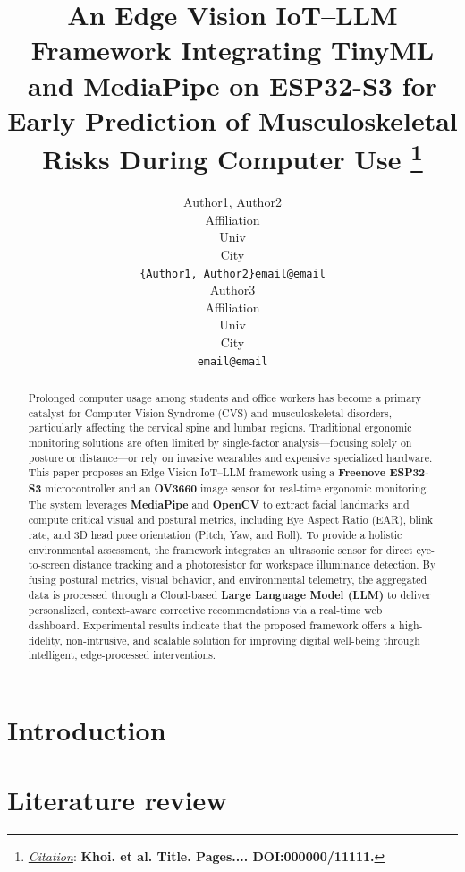 \documentclass{article}
\title{An Edge Vision IoT–LLM Framework Integrating TinyML and MediaPipe on ESP32-S3 for Early Prediction of Musculoskeletal Risks During Computer Use
\thanks{\textit{\underline{Citation}}: 
\textbf{Khoi. et al. Title. Pages.... DOI:000000/11111.}} 
}
\author{
  Author1, Author2 \\
  Affiliation \\
  Univ \\
  City\\
  \texttt{\{Author1, Author2\}email@email} \\
   \And
  Author3 \\
  Affiliation \\
  Univ \\
  City\\
  \texttt{email@email} \\
}
\begin{document}
\maketitle

\begin{abstract}
Prolonged computer usage among students and office workers has become a primary catalyst for Computer Vision Syndrome (CVS) and musculoskeletal disorders, particularly affecting the cervical spine and lumbar regions. Traditional ergonomic monitoring solutions are often limited by single-factor analysis---focusing solely on posture or distance---or rely on invasive wearables and expensive specialized hardware. This paper proposes an Edge Vision IoT--LLM framework using a \textbf{Freenove ESP32-S3} microcontroller and an \textbf{OV3660} image sensor for real-time ergonomic monitoring. The system leverages \textbf{MediaPipe} and \textbf{OpenCV} to extract facial landmarks and compute critical visual and postural metrics, including Eye Aspect Ratio (EAR), blink rate, and 3D head pose orientation (Pitch, Yaw, and Roll). To provide a holistic environmental assessment, the framework integrates an ultrasonic sensor for direct eye-to-screen distance tracking and a photoresistor for workspace illuminance detection. By fusing postural metrics, visual behavior, and environmental telemetry, the aggregated data is processed through a Cloud-based \textbf{Large Language Model (LLM)} to deliver personalized, context-aware corrective recommendations via a real-time web dashboard. Experimental results indicate that the proposed framework offers a high-fidelity, non-intrusive, and scalable solution for improving digital well-being through intelligent, edge-processed interventions.
\end{abstract}





\section{Introduction}





\section{Literature review}
\label{sec:headings}
\end{document}
